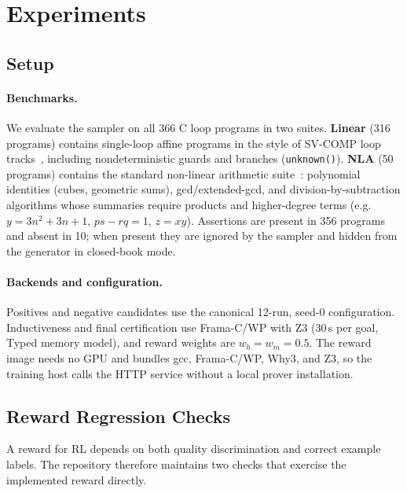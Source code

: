 \section{Experiments}\label{sec:experiments}

\subsection{Setup}
\label{sec:exp:setup}

\paragraph{Benchmarks.}
We evaluate the sampler on all 366 C loop programs in two suites.
\textbf{Linear} (316 programs) contains single-loop affine programs in the style of SV-COMP loop tracks~\citep{svcomp}, including nondeterministic guards and branches (\texttt{unknown()}).
\textbf{NLA} (50 programs) contains the standard non-linear arithmetic suite~\citep{nguyen2012using,nla2019}: polynomial identities (cubes, geometric sums), gcd/extended-gcd, and division-by-subtraction algorithms whose summaries require products and higher-degree terms (e.g.\ $y = 3n^2 + 3n + 1$, $ps - rq = 1$, $z = xy$).
Assertions are present in 356 programs and absent in 10; when present they are ignored by the sampler and hidden from the generator in closed-book mode.

\paragraph{Backends and configuration.}
Positives and negative candidates use the canonical 12-run, seed-0 configuration.  Inductiveness and final certification use Frama-C/WP with Z3 (30\,s per goal, Typed memory model), and reward weights are $w_b=w_m=0.5$.
The reward image needs no GPU and bundles gcc, Frama-C/WP, Why3, and Z3, so the training host calls the HTTP service without a local prover installation.

\subsection{Reward Regression Checks}
\label{sec:exp:gates}

A reward for RL depends on both quality discrimination and correct example labels.  The repository therefore maintains two checks that exercise the implemented reward directly.

